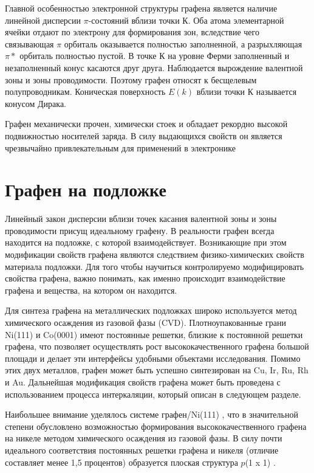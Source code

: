 	Главной особенностью электронной структуры графена является наличие линейной дисперсии $\pi$-состояний вблизи точки К. Оба атома элементарной ячейки отдают по электрону для формирования  зон, вследствие чего связывающая $\pi$ орбиталь оказывается полностью заполненной, а разрыхляющая $\pi*$ орбиталь полностью пустой.  В точке К на уровне Ферми заполненный и незаполненный конус касаются друг друга. Наблюдается вырождение валентной зоны и зоны проводимости. Поэтому графен относят к бесщелевым полупроводникам. Коническая поверхность $E(k)$ вблизи точки К называется конусом Дирака. 
	
	Графен механически прочен, химически стоек и обладает рекордно высокой подвижностью носителей заряда. В силу выдающихся свойств он является чрезвычайно привлекательным для применений в электронике \cite{2}
\section{ Графен на подложке} \label{chapt_graphene-sic}
Линейный закон дисперсии вблизи точек касания валентной зоны и зоны проводимости присущ идеальному графену. В реальности графен всегда находится на подложке, с которой взаимодействует. Возникающие при этом модификации свойств графена являются следствием физико-химических свойств материала подложки. Для того чтобы научиться контролируемо модифицировать свойства графена, важно понимать, как именно происходит взаимодействие графена и вещества, на котором он находится. 

Для синтеза графена на металлических подложках широко используется метод химического осаждения из газовой фазы (CVD). Плотноупакованные грани Ni(111) и Co(0001) имеют постоянные решетки, близкие к постоянной решетки графена, что позволяет осуществлять рост высококачественного графена большой площади и делает эти интерфейсы удобными объектами исследования. Помимо этих двух металлов, графен может быть успешно синтезирован на Cu, Ir, Ru, Rh и Au. Дальнейшая модификация свойств графена может быть проведена с использованием процесса интеркаляции, который описан в следующем разделе.

	Наибольшее внимание уделялось системе графен/Ni(111) \cite{3,4,5,6,7,8,9,10}, что в значительной степени обусловлено возможностью формирования высококачественного графена на никеле методом химического осаждения из газовой фазы. В силу почти идеального соответствия постоянных решетки графена и никеля (отличие составляет менее 1,5 процентов) образуется плоская структура $p$(1 x 1) \cite{3}. 


